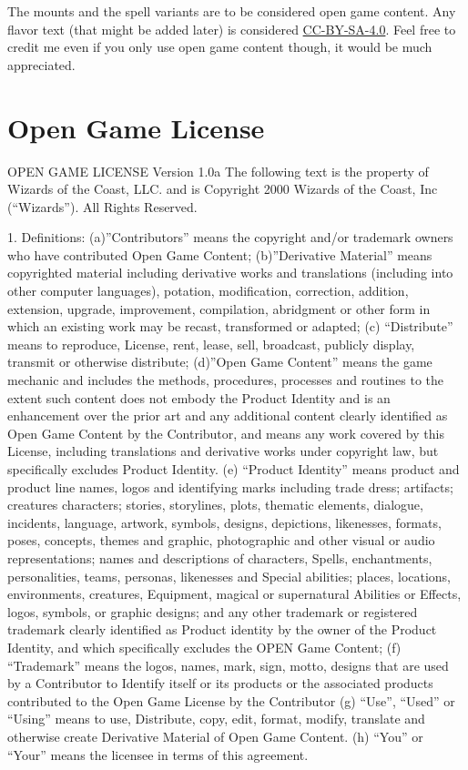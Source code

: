 \documentclass[letterpaper,twocolumn,openany,nodeprecatedcode]{dndbook}
\begin{document}
The mounts and the spell variants are to be considered open game content. Any flavor text (that might be added later) is considered \href{https://creativecommons.org/licenses/by-sa/4.0/legalcode}{CC-BY-SA-4.0}. Feel free to credit me even if you only use open game content though, it would be much appreciated.

\section{Open Game License}

OPEN GAME LICENSE Version 1.0a The following text is the property of Wizards of the Coast, LLC. and is Copyright 2000 Wizards of the Coast, Inc (“Wizards”). All Rights Reserved.

1. Definitions: (a)”Contributors” means the copyright and/or trademark owners who have contributed Open Game Content; (b)”Derivative Material” means copyrighted material including derivative works and translations (including into other computer languages), potation, modification, correction, addition, extension, upgrade, improvement, compilation, abridgment or other form in which an existing work may be recast, transformed or adapted; (c) “Distribute” means to reproduce, License, rent, lease, sell, broadcast, publicly display, transmit or otherwise distribute; (d)”Open Game Content” means the game mechanic and includes the methods, procedures, processes and routines to the extent such content does not embody the Product Identity and is an enhancement over the prior art and any additional content clearly identified as Open Game Content by the Contributor, and means any work covered by this License, including translations and derivative works under copyright law, but specifically excludes Product Identity. (e) “Product Identity” means product and product line names, logos and identifying marks including trade dress; artifacts; creatures characters; stories, storylines, plots, thematic elements, dialogue, incidents, language, artwork, symbols, designs, depictions, likenesses, formats, poses, concepts, themes and graphic, photographic and other visual or audio representations; names and descriptions of characters, Spells, enchantments, personalities, teams, personas, likenesses and Special abilities; places, locations, environments, creatures, Equipment, magical or supernatural Abilities or Effects, logos, symbols, or graphic designs; and any other trademark or registered trademark clearly identified as Product identity by the owner of the Product Identity, and which specifically excludes the OPEN Game Content; (f) “Trademark” means the logos, names, mark, sign, motto, designs that are used by a Contributor to Identify itself or its products or the associated products contributed to the Open Game License by the Contributor (g) “Use”, “Used” or “Using” means to use, Distribute, copy, edit, format, modify, translate and otherwise create Derivative Material of Open Game Content. (h) “You” or “Your” means the licensee in terms of this agreement.
\end{document}
